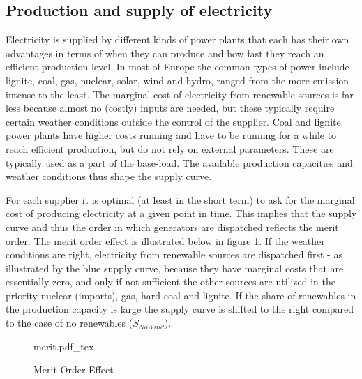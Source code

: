 \subsection{Production and supply of electricity}
\label{subsec:t_production}
Electricity is supplied by different kinds of power plants that each has their own advantages in terms of when they can produce and how fast they reach an efficient production level. In most of Europe the common types of power include lignite, coal, gas, nuclear, solar, wind and hydro, ranged from the more emission intense to the least. The marginal cost of electricity from renewable sources is far less because almost no (costly) inputs are needed, but these typically require certain weather conditions outside the control of the supplier. Coal and lignite power plants have higher costs running and have to be running for a while to reach efficient production, but do not rely on external parameters. These are typically used as a part of the base-load. The available production capacities and weather conditions thus shape the supply curve.
\bigskip \par
For each supplier it is optimal (at least in the short term) to ask for the marginal cost of producing electricity at a given point in time. This implies that the supply curve and thus the order in which generators are dispatched reflects the merit order. The merit order effect is illustrated below in figure \ref{fig:merit}. If the weather conditions are right, electricity from renewable sources are dispatched first - as illustrated by the blue supply curve, because they have marginal costs that are essentially zero, and only if not sufficient the other sources are utilized in the priority nuclear (imports), gas, hard coal and lignite. If the share of renewables in the production capacity is large the supply curve is shifted to the right compared to the case of no renewables ($S_{NoWind}$).
\medskip 
\begin{figure}[H]
    \centering
    \caption{Merit Order Effect}
    \label{fig:merit}
    \center
        \def\svgwidth{0.9\textwidth}
        {merit.pdf_tex}
\end{figure}


